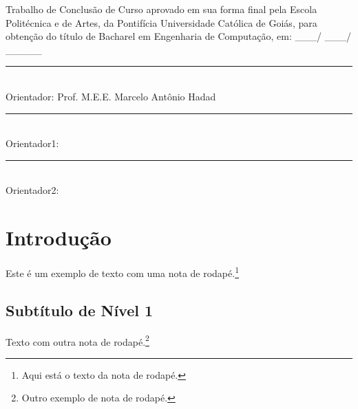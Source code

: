 \documentclass[12pt,a4paper,oneside,brazil]{abntex2}
\begin{document}
\clearpage
    \centering
    \imprimirautor

    \vfill

    \ABNTEXchapterfont\bfseries\imprimirtitulo

    \vfill

    \justifying

    \textnormal{Trabalho de Conclusão de Curso aprovado em sua forma final pela Escola Politécnica e de
    Artes, da Pontifícia Universidade Católica de Goiás, para obtenção do título de Bacharel em
    Engenharia de Computação, em: \_\_\_/ \_\_\_/ \_\_\_\_\_}

    \centering

    \vspace*{3cm}

    \begin{flushright}
    \rule{10cm}{0.4pt}\\
    \textnormal{Orientador: Prof. M.E.E. Marcelo Antônio Hadad}

    \vspace*{10mm}

    \rule{10cm}{0.4pt}\\
    \textnormal{Orientador1:}

    \vspace*{10mm}

    \rule{10cm}{0.4pt}\\
    \textnormal{Orientador2:}
    \end{flushright}

    \vspace*{6cm}

    \bfseries\imprimirlocal

    \bfseries\imprimirdata
\clearpage %

\tableofcontents
\listoffigures   %
\listoftables    %

\textual

\justifying

\chapter{Introdução}
Este é um exemplo de texto com uma nota de rodapé.\footnote{Aqui está o texto da nota de rodapé.} \lipsum[1]

\section{Subtítulo de Nível 1}
Texto com outra nota de rodapé.\footnote{Outro exemplo de nota de rodapé.} \lipsum[2-3]
\end{document}

